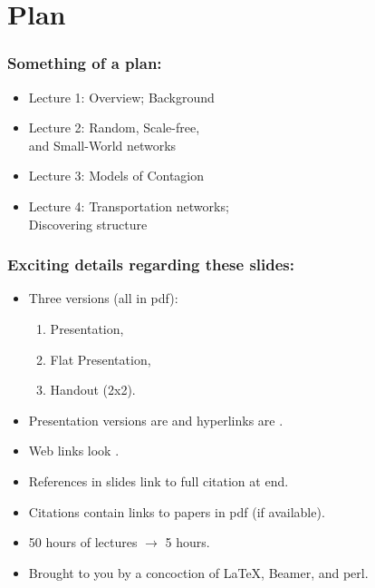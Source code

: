 
\section{Plan}

\begin{frame}
  \frametitle{Something of a plan:}

  \begin{itemize}
  \item<1-> \alert{Lecture 1:} Overview; Background
  \item<2-> \alert{Lecture 2:} Random, Scale-free, \\
    \qquad \qquad and Small-World networks
  \item<3-> \alert{Lecture 3:} Models of Contagion
  \item<4-> \alert{Lecture 4:} Transportation networks; \\
    \qquad \qquad Discovering structure
  \end{itemize}

\end{frame}

\begin{frame}
  \frametitle{Exciting details regarding these slides:}

  \begin{itemize}
  \item<1->
    Three versions (all in pdf): 
    \begin{enumerate}
    \item 
      Presentation,
    \item
      Flat Presentation,
    \item
      Handout (2x2).
    \end{enumerate}
  \item<2->
    Presentation versions are  
    and hyperlinks are .
  \item<3->
    Web links look 
    . 
  \item<4->
    References in slides link to full citation at end.\cite{anderson1972a}
  \item<5->
    Citations contain links to papers in pdf (if available).
  \item<6->
    50 hours of lectures $\rightarrow$ 5 hours.
  \item<7->
    Brought to you by a concoction of \LaTeX, Beamer, and perl.
  \end{itemize}
\end{frame}

